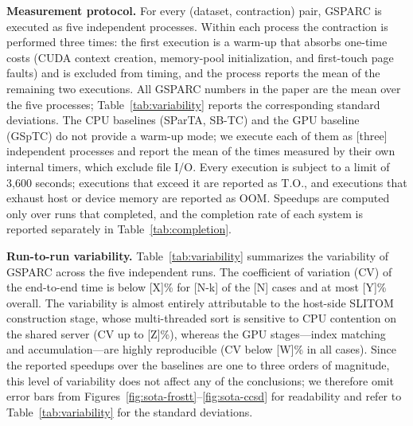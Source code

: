 
\textbf{Measurement protocol.}
For every (dataset, contraction) pair, GSPARC is executed as five independent
processes. Within each process the contraction is performed three times: the
first execution is a warm-up that absorbs one-time costs (CUDA context creation,
memory-pool initialization, and first-touch page faults) and is excluded from
timing, and the process reports the mean of the remaining two executions. All
GSPARC numbers in the paper are the mean over the five processes; Table~\ref{tab:variability}
reports the corresponding standard deviations.
The CPU baselines (SParTA, SB-TC) and the GPU baseline (GSpTC) do not provide
a warm-up mode; we execute each of them as [three] independent processes and report
the mean of the times measured by their own internal timers, which exclude file
I/O. Every execution is subject to a limit of 3,600 seconds; executions that
exceed it are reported as T.O., and executions that exhaust host or device
memory are reported as OOM. Speedups are computed only over runs that
completed, and the completion rate of each system is reported separately in
Table~\ref{tab:completion}.

\textbf{Run-to-run variability.}
Table~\ref{tab:variability} summarizes the variability of GSPARC across the
five independent runs. The coefficient of variation (CV) of the end-to-end time
is below [X]\% for [N-k] of the [N] cases and at most [Y]\% overall.
The variability is almost entirely attributable to the host-side SLITOM
construction stage, whose multi-threaded sort is sensitive to CPU contention on
the shared server (CV up to [Z]\%), whereas the GPU stages---index matching and
accumulation---are highly reproducible (CV below [W]\% in all cases).
Since the reported speedups over the baselines are one to three orders of
magnitude, this level of variability does not affect any of the conclusions;
we therefore omit error bars from Figures~\ref{fig:sota-frostt}--\ref{fig:sota-ccsd}
for readability and refer to Table~\ref{tab:variability} for the standard deviations.
